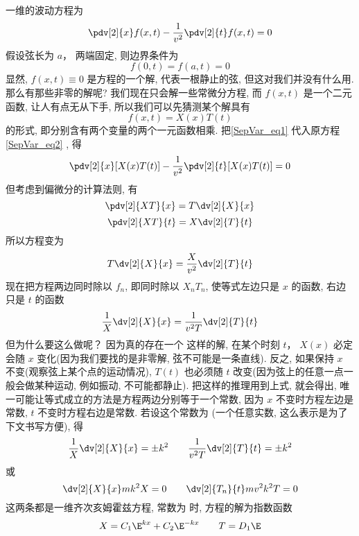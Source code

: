 一维的波动方程为
\begin{equation}
\pdv[2]{x} f(x, t) - \frac{1}{v^2} \pdv[2]{t}f(x, t) = 0
\end{equation}
假设弦长为 $a$， 两端固定, 则边界条件为
\begin{equation}
f(0, t) = f(a, t) = 0
\end{equation}
显然, $f(x, t) \equiv 0$ 是方程的一个解, 代表一根静止的弦, 但这对我们并没有什么用. 那么有那些非零的解呢? 我们现在只会解一些常微分方程, 而 $f(x, t)$ 是一个二元函数, 让人有点无从下手, 所以我们可以先猜测某个解具有
\begin{equation}\label{SepVar_eq1}
f(x, t) = X(x) T(t)
\end{equation}
的形式, 即分别含有两个变量的两个一元函数相乘. 把\autoref{SepVar_eq1} 代入原方程\autoref{SepVar_eq2} , 得
\begin{equation}
\pdv[2]{x}[X(x)T(t)] - \frac{1}{v^2}\pdv[2]{t} [X(x) T(t)] = 0
\end{equation}
但考虑到偏微分的计算法则, 有
\begin{equation}
\pdv[2]{XT}{x} = T \dv[2]{X}{x}
\end{equation}
\begin{equation}
\pdv[2]{XT}{t} = X \dv[2]{T}{t}
\end{equation}
所以方程变为
\begin{equation}
T\dv[2]{X}{x} = \frac{X}{v^2} \dv[2]{T}{t}
\end{equation}
现在把方程两边同时除以 $f_n$, 即同时除以 $X_n T_n$, 使等式左边只是 $x$ 的函数, 右边只是 $t$ 的函数
\begin{equation}
\frac{1}{X}\dv[2]{X}{x} = \frac{1}{v^2 T} \dv[2]{T}{t}
\end{equation}
但为什么要这么做呢？ 因为真的存在一个 这样的解, 在某个时刻 $t$， $X(x)$ 必定会随 $x$ 变化(因为我们要找的是非零解, 弦不可能是一条直线). 反之, 如果保持 $x$ 不变(观察弦上某个点的运动情况), $T(t)$ 也必须随 $t$ 改变(因为弦上的任意一点一般会做某种运动, 例如振动, 不可能都静止). 把这样的推理用到上式, 就会得出, 唯一可能让等式成立的方法是方程两边分别等于一个常数, 因为 $x$ 不变时方程左边是常数,  $t$ 不变时方程右边是常数. 若设这个常数为 (一个任意实数, 这么表示是为了下文书写方便), 得
\begin{equation}
\frac{1}{X}\dv[2]{X}{x} = \pm k^2
\qquad
\frac{1}{v^2 T}\dv[2]{T}{t} = \pm k^2
\end{equation}
或
\begin{equation}
\dv[2]{X}{x} mk^2 X = 0
\qquad
\dv[2]{T_n}{t} mv^2k^2 T = 0
\end{equation}
这两条都是一维齐次亥姆霍兹方程, 常数为 时, 方程的解为指数函数
\begin{equation}
X = C_1 \E^{kx} + C_2 \E^{-kx}
\qquad
T = D_1 \E
\end{equation}

